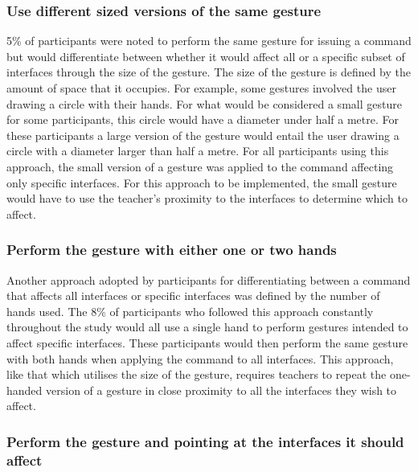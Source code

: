 \documentclass[manuscript, review, screen]{acmart}
\begin{document}
\subsubsection{Use different sized versions of the same gesture}

5\% of participants were noted to perform the same gesture for issuing a command but would differentiate between whether it would affect all or a specific subset of interfaces through the size of the gesture.
The size of the gesture is defined by the amount of space that it occupies.
For example, some gestures involved the user drawing a circle with their hands.
For what would be considered a small gesture for some participants, this circle would have a diameter under half a metre.
For these participants a large version of the gesture would entail the user drawing a circle with a diameter larger than half a metre.
For all participants using this approach, the small version of a gesture was applied to the command affecting only specific interfaces.
For this approach to be implemented, the small gesture would have to use the teacher's proximity to the interfaces to determine which to affect.

\subsubsection{Perform the gesture with either one or two hands}

Another approach adopted by participants for differentiating between a command that affects all interfaces or specific interfaces was defined by the number of hands used. 
The 8\% of participants who followed this approach constantly throughout the study would all use a single hand to perform gestures intended to affect specific interfaces.
These participants would then perform the same gesture with both hands when applying the command to all interfaces.
This approach, like that which utilises the size of the gesture, requires teachers to repeat the one-handed version of a gesture in close proximity to all the interfaces they wish to affect.

\subsubsection{Perform the gesture and pointing at the interfaces it should affect}
\end{document}
